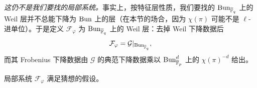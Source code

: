 \emph{这仍不是我们要找的局部系统。}事实上，按特征层性质，我们要找的 $\mathrm{Bun}_{\overline{\mathbb{F}}_q}$ 上的 Weil 层并不总能下降为 $\mathrm{Bun}$ 上的层（在本节的场合，因为 $\chi(\pi)$ 可能不是 $\ell$-进单位）。于是定义 $\mathcal{F}_\varphi$ 为 $\mathrm{Bun}_{\overline{\mathbb{F}}_q}$ 上的 Weil 层：去掉 Weil 下降数据后
\[
\mathcal{F}_\varphi = \mathcal{G}|_{\mathrm{Bun}_{\overline{\mathbb{F}}_q}},
\]
而其 Frobenius 下降数据由 $\mathcal{G}$ 的典范下降数据乘以 $\mathrm{Bun}^d_{\overline{\mathbb{F}}_p}$ 上的 $\chi(\pi)^{-d}$ 给出。

\begin{proposition}\label{prop:9.2}
局部系统 $\mathcal{F}_\varphi$ 满足猜想的假设。
\end{proposition}

